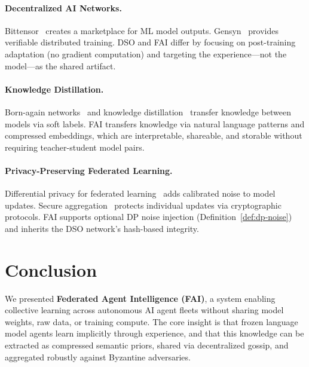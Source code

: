\documentclass[11pt]{article}
\begin{document}
\paragraph{Decentralized AI Networks.}
Bittensor~\cite{bittensor2023} creates a marketplace for ML model outputs.
Gensyn~\cite{gensyn2023} provides verifiable distributed training. DSO
and FAI differ by focusing on post-training adaptation (no gradient
computation) and targeting the experience---not the model---as the shared artifact.

\paragraph{Knowledge Distillation.}
Born-again networks~\cite{furlanello2018born} and knowledge
distillation~\cite{hinton2015distilling} transfer knowledge between models
via soft labels. FAI transfers knowledge via natural language patterns and
compressed embeddings, which are interpretable, shareable, and storable
without requiring teacher-student model pairs.

\paragraph{Privacy-Preserving Federated Learning.}
Differential privacy for federated learning~\cite{mcmahan2018learning}
adds calibrated noise to model updates. Secure aggregation~\cite{bonawitz2017practical}
protects individual updates via cryptographic protocols. FAI supports
optional DP noise injection (Definition~\ref{def:dp-noise}) and inherits
the DSO network's hash-based integrity.

\section{Conclusion}
\label{sec:conclusion}

We presented \textbf{Federated Agent Intelligence (FAI)}, a system enabling
collective learning across autonomous AI agent fleets without sharing model
weights, raw data, or training compute. The core insight is that frozen
language model agents learn implicitly through experience, and that this
knowledge can be extracted as compressed semantic priors, shared via
decentralized gossip, and aggregated robustly against Byzantine adversaries.
\end{document}
